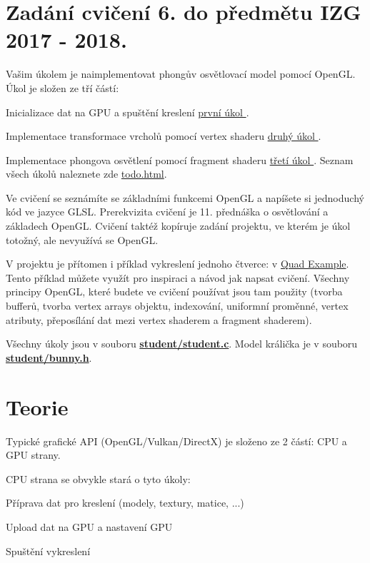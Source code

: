\hypertarget{index_zadani}{}\section{Zadání cvičení 6. do předmětu I\-Z\-G 2017 -\/ 2018.}\label{index_zadani}
Vašim úkolem je naimplementovat phongův osvětlovací model pomocí Open\-G\-L. Úkol je složen ze tří částí\-:
\begin{DoxyItemize}
\item Inicializace dat na G\-P\-U a spuštění kreslení \hyperlink{group__task1}{první úkol }. 
\item Implementace transformace vrcholů pomocí vertex shaderu \hyperlink{group__task2}{druhý úkol }. 
\item Implementace phongova osvětlení pomocí fragment shaderu \hyperlink{group__task3}{třetí úkol }.  Seznam všech úkolů naleznete zde \hyperlink{todo}{todo.\-html}.
\end{DoxyItemize}

Ve cvičení se seznámíte se základními funkcemi Open\-G\-L a napíšete si jednoduchý kód ve jazyce G\-L\-S\-L. Prerekvizita cvičení je 11. přednáška o osvětlování a základech Open\-G\-L. Cvičení taktéž kopíruje zadání projektu, ve kterém je úkol totožný, ale nevyužívá se Open\-G\-L.

V projektu je přítomen i příklad vykreslení jednoho čtverce\-: v \hyperlink{quadExample-example}{Quad Example}. Tento příklad můžete využít pro inspiraci a návod jak napsat cvičení. Všechny principy Open\-G\-L, které budete ve cvičení používat jsou tam použity (tvorba bufferů, tvorba vertex arrays objektu, indexování, uniformní proměnné, vertex atributy, přeposílání dat mezi vertex shaderem a fragment shaderem).

Všechny úkoly jsou v souboru {\bfseries \hyperlink{student_8c}{student/student.\-c}}. Model králička je v souboru {\bfseries \hyperlink{bunny_8h}{student/bunny.\-h}}.\hypertarget{index_teorie}{}\section{Teorie}\label{index_teorie}
Typické grafické A\-P\-I (Open\-G\-L/\-Vulkan/\-Direct\-X) je složeno ze 2 částí\-: C\-P\-U a G\-P\-U strany.

C\-P\-U strana se obvykle stará o tyto úkoly\-:
\begin{DoxyItemize}
\item Příprava dat pro kreslení (modely, textury, matice, ...)
\item Upload dat na G\-P\-U a nastavení G\-P\-U
\item Spuštění vykreslení
\end{DoxyItemize}

